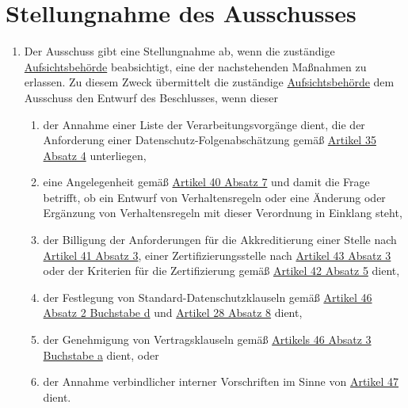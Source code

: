\chapter{Stellungnahme des Ausschusses}
\label{ch:64}


\begin{enumerate}

  \item Der Ausschuss gibt eine Stellungnahme ab, wenn die zuständige \hyperref[itm:04-21]
   {Aufsichtsbehörde} beabsichtigt, eine der nachstehenden Maßnahmen zu erlassen. Zu diesem Zweck übermittelt die
   zuständige \hyperref[itm:04-21]{Aufsichtsbehörde} dem Ausschuss den Entwurf des Beschlusses, wenn dieser
  \label{itm:64-1}

  \begin{enumerate}
  
    \item der Annahme einer Liste der Verarbeitungsvorgänge dient, die der Anforderung einer
     Datenschutz-Folgenabschätzung gemäß \hyperref[itm:35-4]{Artikel 35 Absatz 4} unterliegen,
    \label{itm:64-1a}

    \item eine Angelegenheit gemäß \hyperref[itm:40-7]{Artikel 40 Absatz 7} und damit die Frage betrifft, ob ein Entwurf
     von Verhaltensregeln oder eine Änderung oder Ergänzung von Verhaltensregeln mit dieser Verordnung in Einklang
     steht,
    \label{itm:64-1b}

    \item der Billigung der Anforderungen für die Akkreditierung einer Stelle nach \hyperref[itm:41-3]{Artikel 41 Absatz
     3}, einer Zertifizierungsstelle nach \hyperref[itm:43-3]{Artikel 43 Absatz 3} oder der Kriterien für die
     Zertifizierung gemäß \hyperref[itm:42-5]{Artikel 42 Absatz 5} dient,
    \label{itm:64-1c}

    \item der Festlegung von Standard-Datenschutzklauseln gemäß \hyperref[itm:46-2d]{Artikel 46 Absatz 2 Buchstabe d}
     und \hyperref[itm:28-8]{Artikel 28 Absatz 8} dient,
    \label{itm:64-1d}

    \item der Genehmigung von Vertragsklauseln gemäß \hyperref[itm:46-3a]{Artikels 46 Absatz 3 Buchstabe a} dient, oder
    \label{itm:64-1e}

    \item der Annahme verbindlicher interner Vorschriften im Sinne von \hyperref[ch:47]{Artikel 47} dient.
    \label{itm:64-1f}


\end{enumerate}
\end{enumerate}
